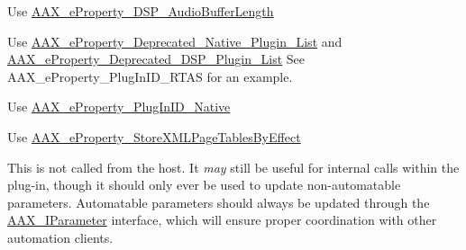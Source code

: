 \begin{DoxyRefList}
\item[Member \mbox{\hyperlink{a00674_a13e384f22825afd3db6d68395b79ce0da34b1ae8c8edd3080aee6cd677bed9611}{AAX\+\_\+e\+Property\+\_\+\+Audio\+Buffer\+Length}} ]\label{a00803__deprecated000017}%
%
Use \mbox{\hyperlink{a00674_a13e384f22825afd3db6d68395b79ce0da09fbd1cbcae0e86ad81005258dc1b67e}{AAX\+\_\+e\+Property\+\_\+\+DSP\+\_\+\+Audio\+Buffer\+Length}}  
\item[Member \mbox{\hyperlink{a00674_a13e384f22825afd3db6d68395b79ce0da2414ef0c66df40f47ec8f8092de3b94a}{AAX\+\_\+e\+Property\+\_\+\+Deprecated\+\_\+\+Plugin\+\_\+\+List}} ]\label{a00803__deprecated000016}%
%
Use \mbox{\hyperlink{a00674_a13e384f22825afd3db6d68395b79ce0da3f1e690c987d601001a7cc1da8247399}{AAX\+\_\+e\+Property\+\_\+\+Deprecated\+\_\+\+Native\+\_\+\+Plugin\+\_\+\+List}} and \mbox{\hyperlink{a00674_a13e384f22825afd3db6d68395b79ce0dab102bc794f2770c14b1f0fe2dde6766a}{AAX\+\_\+e\+Property\+\_\+\+Deprecated\+\_\+\+DSP\+\_\+\+Plugin\+\_\+\+List}} See AAX\+\_\+e\+Property\+\_\+\+Plug\+In\+ID\+\_\+\+RTAS for an example.  
\item[Member \mbox{\hyperlink{a00674_a13e384f22825afd3db6d68395b79ce0da01880753b83fc0a40d99a5381301a9cf}{AAX\+\_\+e\+Property\+\_\+\+Plug\+In\+ID\+\_\+\+RTAS}} ]\label{a00803__deprecated000015}%
%
Use \mbox{\hyperlink{a00674_a13e384f22825afd3db6d68395b79ce0da89ca3dd6e96895cda14976c1b1ceb826}{AAX\+\_\+e\+Property\+\_\+\+Plug\+In\+ID\+\_\+\+Native}}  
\item[Member \mbox{\hyperlink{a00674_a13e384f22825afd3db6d68395b79ce0dae555ac90959bcee0301eed22dff52b03}{AAX\+\_\+e\+Property\+\_\+\+Store\+XMLPage\+Tables\+By\+Type}} ]\label{a00803__deprecated000018}%
%
Use \mbox{\hyperlink{a00674_a13e384f22825afd3db6d68395b79ce0da1837e77c3a427004ac44714a8c9cbad9}{AAX\+\_\+e\+Property\+\_\+\+Store\+XMLPage\+Tables\+By\+Effect}}  
\item[Member \mbox{\hyperlink{a01953_a54403bec090fcc999a93f54c01bca0c9}{AAX\+\_\+\+IACFEffect\+Parameters\+::Update\+Parameter\+Normalized\+Relative}} (AAX\+\_\+\+CParam\+ID i\+Parameter\+ID, double i\+Value)=0]\label{a00803__deprecated000013}%
%
This is not called from the host. It {\itshape may} still be useful for internal calls within the plug-\/in, though it should only ever be used to update non-\/automatable parameters. Automatable parameters should always be updated through the \mbox{\hyperlink{a02145}{AAX\+\_\+\+IParameter}} interface, which will ensure proper coordination with other automation clients. 

\end{DoxyRefList}
